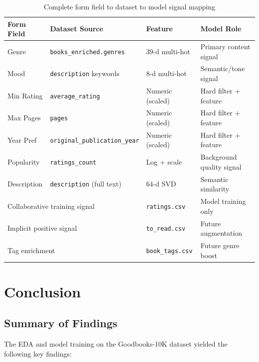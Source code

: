 \documentclass[12pt, a4paper]{article}
\newcommand{\code}[1]{\texttt{\small\color{shelfPurple}#1}}
\begin{document}
\begin{table}[H]
\centering
\caption{Complete form field to dataset to model signal mapping}
\begin{tabularx}{\textwidth}{@{}lllX@{}}
\toprule
\textbf{Form Field} & \textbf{Dataset Source} & \textbf{Feature} & \textbf{Model Role} \\
\midrule
Genre & \code{books\_enriched.genres} & 39-d multi-hot & Primary content signal \\
Mood & \code{description} keywords & 8-d multi-hot & Semantic/tone signal \\
Min Rating & \code{average\_rating} & Numeric (scaled) & Hard filter + feature \\
Max Pages & \code{pages} & Numeric (scaled) & Hard filter + feature \\
Year Pref & \code{original\_publication\_year} & Numeric (scaled) & Hard filter + feature \\
Popularity & \code{ratings\_count} & Log + scale & Background quality signal \\
Description & \code{description} (full text) & 64-d SVD & Semantic similarity \\
\midrule
\multicolumn{2}{l}{Collaborative training signal} & \code{ratings.csv} & Model training only \\
\multicolumn{2}{l}{Implicit positive signal} & \code{to\_read.csv} & Future augmentation \\
\multicolumn{2}{l}{Tag enrichment} & \code{book\_tags.csv} & Future genre boost \\
\bottomrule
\end{tabularx}
\end{table}

\section{Conclusion}

\subsection{Summary of Findings}

The EDA and model training on the Goodbooks-10K dataset yielded the following
key findings:
\end{document}
